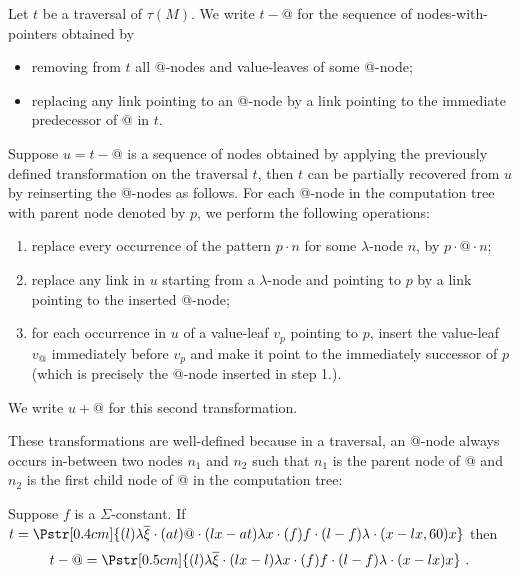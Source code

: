 \begin{definition}
\label{dfn:appnode_filter} Let $t$ be a traversal of $\tau(M)$. We
write $t-@$ for the sequence of nodes-with-pointers obtained by
\begin{itemize}
\item removing from $t$ all @-nodes and value-leaves of some @-node;
\item replacing any link pointing to an @-node by a link pointing to the immediate predecessor of @ in $t$.
\end{itemize}


Suppose $u = t-@$ is a sequence of nodes obtained by applying the
previously defined transformation on the traversal $t$, then $t$ can
be partially recovered from $u$ by reinserting the @-nodes as
follows. For each @-node in the computation tree with parent node
denoted by $p$, we perform the following operations:
\begin{enumerate}
\item replace every occurrence of the pattern $p \cdot n$ for some $\lambda$-node $n$, by $p \cdot @ \cdot n$;
\item replace any link in $u$ starting from a $\lambda$-node and pointing to $p$ by a link pointing to the inserted @-node;
\item for each occurrence in $u$ of a value-leaf $v_p$ pointing to $p$, insert the value-leaf $v_@$
    immediately before $v_p$ and make it point to the
    immediately successor of $p$ (which is precisely the $@$-node
inserted in step 1.).
\end{enumerate}
We write $u+@$ for this second transformation.
\end{definition}
These transformations are well-defined because in a traversal, an
@-node always occurs in-between two nodes $n_1$ and $n_2$ such that
$n_1$ is the parent node of @ and $n_2$ is the first child node of @
in the computation tree:
\begin{center}
\end{center}
\begin{example} Suppose $f$ is a $\Sigma$-constant.
If $t = \Pstr[0.4cm]{ (l){\lambda \overline{\xi}} \cdot (at)@ \cdot (lx-at){\lambda x}\cdot (f)f \cdot (l-f){\lambda} \cdot (x-lx,60)x}$ then
$$t-@ = \Pstr[0.5cm]{ (l){\lambda \overline{\xi}}
 \cdot (lx-l){\lambda x}\cdot (f)f\cdot (l-f){\lambda} \cdot (x-lx)x} \ .$$
\end{example}

